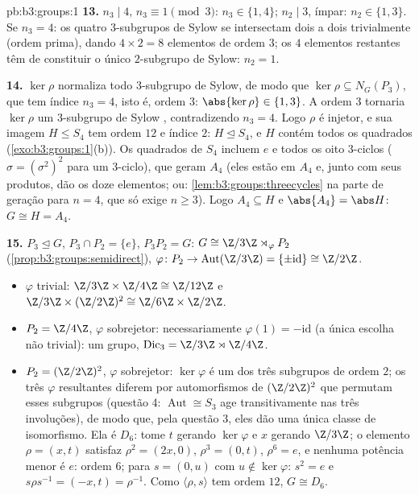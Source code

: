 \begin{solution}{pb:b3:groups:1}
\textbf{13.} $n_3 \mid 4$, $n_3 \equiv 1 \pmod 3$: $n_3 \in \{1,
4\}$; $n_2 \mid 3$, ímpar: $n_2 \in \{1, 3\}$. Se $n_3 = 4$: os
quatro $3$-subgrupos de Sylow se intersectam dois a dois
trivialmente (ordem prima), dando $4 \times 2 = 8$ elementos de ordem $3$; os
$4$ elementos restantes têm de constituir o único $2$-subgrupo de
Sylow: $n_2 = 1$.

\textbf{14.} $\ker\rho$ normaliza todo $3$-subgrupo de Sylow, de modo que
$\ker \rho \subseteq N_G(P_3)$, que tem índice $n_3 = 4$, isto é, ordem $3$: $\abs{\ker\rho} \in \{1, 3\}$. A ordem
$3$ tornaria $\ker\rho$ um $3$-subgrupo de Sylow \emph{},
contradizendo $n_3
= 4$. Logo $\rho$ é injetor, e sua imagem $H \leq S_4$ tem
ordem $12$ e índice $2$: $H \trianglelefteq S_4$, e $H$ contém todos os
quadrados (\cref{exo:b3:groups:1}(b)). Os quadrados de $S_4$ incluem $e$
e todos os oito $3$-ciclos ($\sigma = (\sigma^2)^2$ para um $3$-ciclo), que geram
$A_4$ (eles estão em $A_4$ e, junto com seus produtos, dão os
doze elementos; ou: \cref{lem:b3:groups:threecycles} na parte de geração para $n = 4$,
que só exige $n \geq 3$). Logo $A_4 \subseteq H$ e $\abs{A_4}
= \abs H$: $G \cong H = A_4$.

\textbf{15.} $P_3 \trianglelefteq G$, $P_3 \cap P_2 = \{e\}$, $P_3P_2 = G$: $G \cong \Z/3\Z \rtimes_\varphi P_2$ (\cref{prop:b3:groups:semidirect}), $\varphi \colon P_2 \to
\operatorname{Aut}(\Z/3\Z) = \{\pm\mathrm{id}\} \cong \Z/2\Z$.
\begin{itemize}
  \item $\varphi$ trivial:  $\Z/3\Z \times \Z/4\Z
        \cong \Z/12\Z$ e $\Z/3\Z \times (\Z/2\Z)^2 \cong \Z/6\Z
        \times \Z/2\Z$.
  \item $P_2 = \Z/4\Z$, $\varphi$ sobrejetor: necessariamente $\varphi(1) = -\mathrm{id}$ (a única escolha
        não trivial): um grupo, $\mathrm{Dic}_3 = \Z/3\Z \rtimes \Z/4\Z$.
  \item $P_2 = (\Z/2\Z)^2$, $\varphi$ sobrejetor: $\ker\varphi$ é um dos três subgrupos de ordem
        $2$; os três $\varphi$ resultantes diferem por automorfismos de
        $(\Z/2\Z)^2$ que permutam esses subgrupos (questão 4: $\operatorname{Aut}
        \cong S_3$ age
        transitivamente nas três involuções), de modo que, pela questão
        3, eles dão uma única classe de isomorfismo. Ela é $D_6$:
        tome $t$ gerando $\ker\varphi$ e $x$ gerando $\Z/3\Z$; o
        elemento $\rho = (x, t)$ satisfaz $\rho^2 = (2x, 0)$, $\rho^3 = (0, t)$, $\rho^6 = e$, e nenhuma potência
        menor é $e$: ordem $6$; para $s = (0, u)$ com $u
        \notin \ker\varphi$: $s^2 = e$ e
        $s\rho s^{-1} = (-x, t)
        = \rho^{-1}$. Como $\langle \rho, s\rangle$ tem ordem $12$, $G \cong D_6$.
\end{itemize}


\end{solution}
